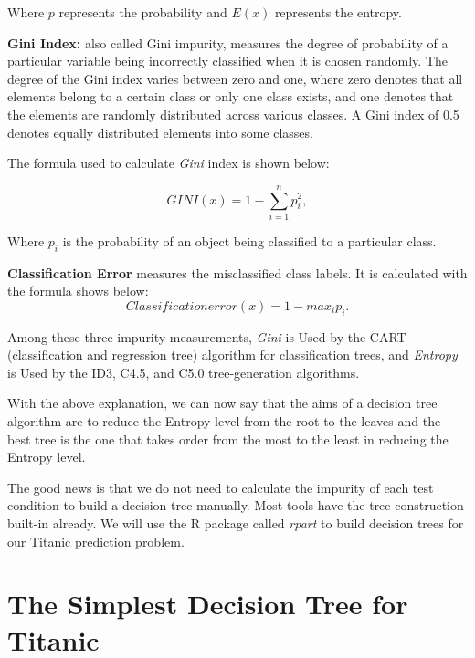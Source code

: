 \documentclass[
]{book}
\begin{document}
Where \(p\) represents the probability and \(E(x)\) represents the entropy.

\textbf{Gini Index:} also called Gini impurity, measures the degree of probability of a particular variable being incorrectly classified when it is chosen randomly. The degree of the Gini index varies between zero and one, where zero denotes that all elements belong to a certain class or only one class exists, and one denotes that the elements are randomly distributed across various classes. A Gini index of 0.5 denotes equally distributed elements into some classes.

The formula used to calculate \emph{Gini} index is shown below:

\begin{equation} 
GINI(x) = 1- ∑_{i=1}^{n}p_i^2,
  \label{eq:Gini}
\end{equation}

Where \(p_i\) is the probability of an object being classified to a particular class.

\textbf{Classification Error} measures the misclassified class labels. It is calculated with the formula shows below:
\begin{equation} 
Classification error(x)= 1 - max_{i}p_i.
  \label{eq:clerror}
\end{equation}

Among these three impurity measurements, \emph{Gini} is Used by the CART (classification and regression tree) algorithm for classification trees, and \emph{Entropy} is Used by the ID3, C4.5, and C5.0 tree-generation algorithms.

With the above explanation, we can now say that the aims of a decision tree algorithm are to reduce the Entropy level from the root to the leaves and the best tree is the one that takes order from the most to the least in reducing the Entropy level.

The good news is that we do not need to calculate the impurity of each test condition to build a decision tree manually. Most tools have the tree construction built-in already. We will use the R package called \emph{rpart} to build decision trees for our Titanic prediction problem.

\hypertarget{the-simplest-decision-tree-for-titanic}{%
\section{The Simplest Decision Tree for Titanic}\label{the-simplest-decision-tree-for-titanic}}
\end{document}
